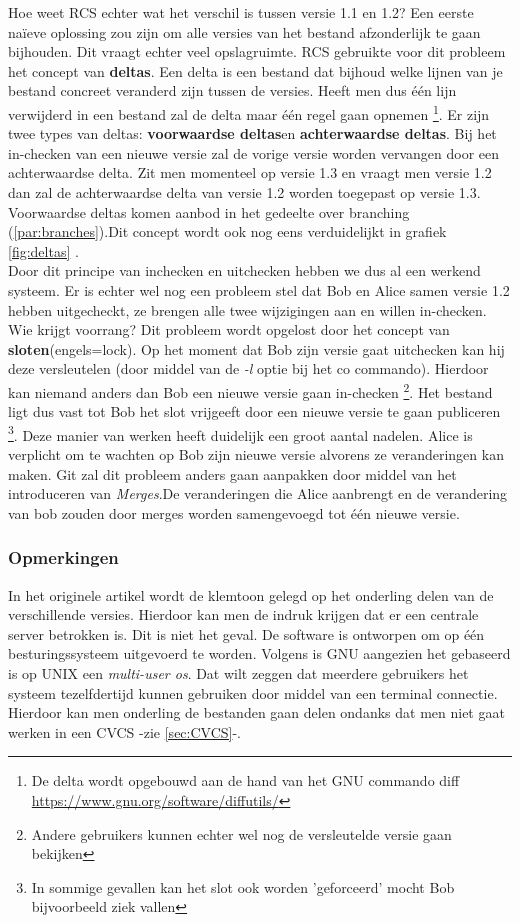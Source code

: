 Hoe weet RCS echter wat het verschil is tussen versie 1.1 en 1.2? Een eerste naïeve oplossing zou zijn om alle versies van het bestand afzonderlijk te gaan bijhouden. Dit vraagt echter veel opslagruimte. RCS gebruikte voor dit probleem het concept van \textbf{deltas}. Een delta is een bestand dat bijhoud welke lijnen van je bestand concreet veranderd zijn tussen de versies. Heeft men dus één lijn verwijderd in een bestand zal de delta maar één regel gaan opnemen \footnote{De delta wordt opgebouwd aan de hand van het GNU commando diff \url{https://www.gnu.org/software/diffutils/}}. Er zijn twee types van deltas: \textbf{voorwaardse deltas}en \textbf{achterwaardse deltas}. Bij het in-checken van een nieuwe versie zal de vorige versie worden vervangen door een achterwaardse  delta. Zit men momenteel op versie 1.3 en  vraagt men versie 1.2 dan zal de achterwaardse delta van versie 1.2 worden toegepast op versie 1.3. Voorwaardse deltas komen aanbod in het gedeelte over branching (\ref{par:branches}).Dit concept wordt ook nog eens verduidelijkt in grafiek \ref{fig:deltas} .\\

Door dit principe van inchecken en uitchecken hebben we dus al een werkend systeem. Er is echter wel nog een probleem stel dat Bob en Alice samen versie 1.2 hebben uitgecheckt, ze brengen alle twee wijzigingen aan en willen in-checken. Wie krijgt voorrang? Dit probleem wordt opgelost door het concept van \textbf{sloten}(engels=lock). Op het moment dat  Bob zijn versie gaat uitchecken kan hij deze versleutelen (door middel van de \textit{-l} optie bij het co commando). Hierdoor kan niemand anders dan Bob een nieuwe versie gaan in-checken \footnote{Andere gebruikers kunnen echter wel nog de versleutelde versie gaan bekijken}. Het bestand ligt dus vast tot Bob het slot vrijgeeft door een nieuwe versie te gaan publiceren \footnote{In sommige gevallen kan het slot ook worden 'geforceerd' mocht Bob bijvoorbeeld ziek vallen}. Deze manier van werken heeft duidelijk een groot aantal nadelen. Alice is verplicht om te wachten op Bob zijn nieuwe versie alvorens ze veranderingen kan maken. Git zal dit probleem anders gaan aanpakken door middel van het introduceren van \textit{Merges}.De veranderingen die Alice aanbrengt en de verandering van bob zouden door merges worden samengevoegd tot één nieuwe versie.\\

\label{par:branches}

\subsubsection{Opmerkingen}
In het originele artikel wordt de klemtoon gelegd op het onderling delen van de verschillende versies. Hierdoor kan men de indruk krijgen dat er een centrale server betrokken is. Dit is niet het geval. De software is ontworpen om op één besturingssysteem uitgevoerd te worden. Volgens \textcite{Debian2020} is GNU aangezien het gebaseerd is op UNIX een \textit{multi-user os}. Dat wilt zeggen dat meerdere gebruikers het systeem tezelfdertijd kunnen gebruiken door middel van een terminal connectie. Hierdoor kan men onderling de bestanden gaan delen ondanks dat men niet gaat werken in een CVCS -zie \ref{sec:CVCS}-.

